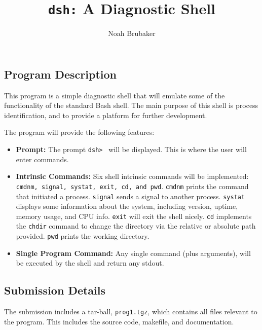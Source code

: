 \documentclass[11pt,a4paper]{article}
\author{Noah Brubaker}
\title{\texttt{dsh:} A Diagnostic Shell}
\newcommand{\nl}{\vspace{10pt}}
\begin{document}
\maketitle
{}
\flushleft

\subsection*{Program Description}

This program is a simple diagnostic shell that will emulate some of the functionality of the standard Bash shell. The main purpose of this shell is process identification, and to provide a platform for further development.\nl

The program will provide the following features:
\begin{itemize}

\item \textbf{Prompt:} The prompt \texttt{dsh> } will be displayed. This is where the user will enter commands. 

\item \textbf{Intrinsic Commands:} Six shell intrinsic commands will be implemented: \texttt{cmdnm, signal, systat, exit, cd, and pwd}. \texttt{cmdnm} prints the command that initiated a process. \texttt{signal} sends a signal to another process. \texttt{systat} displays some information about the system, including version, uptime, memory usage, and CPU info. \texttt{exit} will exit the shell nicely. \texttt{cd} implements the \texttt{chdir} command to change the directory via the relative or absolute path provided. \texttt{pwd} prints the working directory.

\item \textbf{Single Program Command:} Any single command (plus arguments), will be executed by the shell and return any stdout.

\end{itemize}

\subsection*{Submission Details}

The submission includes a tar-ball, \texttt{prog1.tgz}, which contains all files relevant to the program. This includes the source code, makefile, and documentation.\nl
\end{document}
